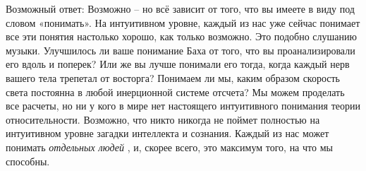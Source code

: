 \documentclass[../main.tex]{subfiles}
\begin{document}
Возможный ответ: Возможно \--- но всё зависит от того, что вы имеете в виду под словом «понимать». На интуитивном уровне, каждый из нас уже сейчас понимает все эти понятия настолько хорошо, как только возможно. Это подобно слушанию музыки. Улучшилось ли ваше понимание Баха от того, что вы проанализировали его вдоль и поперек? Или же вы лучше понимали его тогда, когда каждый нерв вашего тела трепетал от восторга? Понимаем ли мы, каким образом скорость света постоянна в любой инерционной системе отсчета? Мы можем проделать все расчеты, но ни у кого в мире нет настоящего интуитивного понимания теории относительности. Возможно, что никто никогда не поймет полностью на интуитивном уровне загадки интеллекта и сознания. Каждый из нас может понимать \emph{отдельных людей} , и, скорее всего, это максимум того, на что мы способны.
\end{document}
